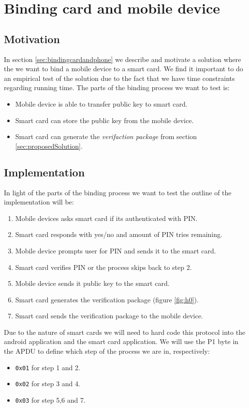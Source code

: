 \section{Binding card and mobile device}
\subsection{Motivation}
In section \ref{sec:bindingcardandphone} we describe and motivate a solution where the we want to bind a mobile device to a smart card. We find it important to do an empirical test of the solution due to the fact that we have time constraints regarding running time. The parts of the binding process we want to test is:

\begin{itemize}
    \item Mobile device is able to transfer public key to smart card.
    \item Smart card can store the public key from the mobile device.
    \item Smart card can generate the \textit{verifaction package} from section \ref{sec:proposedSolution}.
\end{itemize}

\subsection{Implementation}
In light of the parts of the binding process we want to test the outline of the implementation will be:

\begin{enumerate}
    \item Mobile devices asks smart card if its authenticated with PIN.
    \item Smart card responds with yes/no and amount of PIN tries remaining.
    \item Mobile device prompts user for PIN and sends it to the smart card.
    \item Smart card verifies PIN or the process skips back to step 2.
    \item Mobile device sends it public key to the smart card.
    \item Smart card generates the verification package (figure \ref{fig:h0}).
    \item Smart card sends the verification package to the mobile device.
\end{enumerate}

Due to the nature of smart cards we will need to hard code this protocol into the android application and the smart card application. We will use the P1 byte in the APDU to define which step of the process we are in, respectively:
\begin{itemize}
    \item \texttt{0x01} for step 1 and 2.
    \item \texttt{0x02} for step 3 and 4.
    \item \texttt{0x03} for step 5,6 and 7.
\end{itemize}


